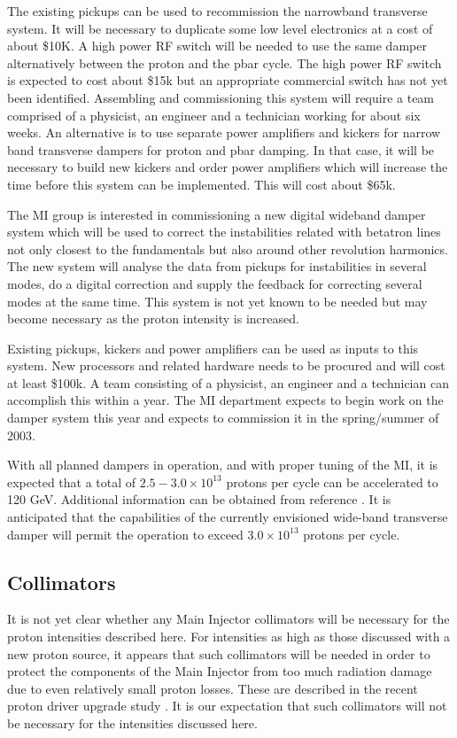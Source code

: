 \documentclass{article}
\begin{document}
The existing pickups can be used to recommission the narrowband transverse 
system. It will be necessary to duplicate some low level electronics at a 
cost of about
\$10K. A high power RF switch will be needed to use the same damper 
alternatively between the proton and the pbar cycle. The high power RF switch 
is expected to cost about \$15k but an appropriate commercial switch has not 
yet been identified. Assembling and commissioning this system
will require a team comprised of a physicist, an engineer and a technician
working for about six weeks. An alternative is to use separate power 
amplifiers and kickers for narrow band transverse dampers for proton and pbar 
damping. In that case, it will be necessary to build new kickers and 
order power amplifiers which will increase the time before this system can
be implemented. This will cost about \$65k.

The MI group is interested in commissioning a new digital wideband damper 
system which will be used to correct the instabilities related with betatron
lines not only closest to the fundamentals but also around other revolution
harmonics. The new system will analyse the data 
from pickups for instabilities in several modes, do a digital correction and 
supply the feedback for correcting several modes at the same time. This system
is not yet known to be needed but may become necessary as the proton intensity
is increased.

Existing pickups, kickers and power amplifiers can be used as inputs to
this system. New processors and related hardware needs to be procured and
will cost at least \$100k. A team consisting of a physicist,
an engineer and a technician can accomplish this within a year. The MI 
department expects to begin work on the damper system this year and 
expects to commission it in the spring/summer of 2003. 

With all planned dampers in operation, and with proper tuning of the MI,
it is expected that a total of $2.5-3.0\times10^{13}$ protons per cycle
can be accelerated to
120 GeV. Additional information can be obtained from reference 
\cite {Steimel}. It is anticipated that the capabilities of the 
currently envisioned wide-band
transverse damper will permit the operation to exceed $3.0 \times 10^{13}$
protons per cycle. 

\subsection {Collimators}
   It is not yet clear whether any Main Injector collimators will be necessary 
for the proton intensities described here. For intensities as high as those
discussed with a new proton source, it appears that such collimators will be
needed in order to protect the components of the Main Injector from too much
radiation damage due to even relatively small proton losses. These are 
described in the recent proton driver upgrade study \cite {PDstudy}. It
is our expectation that such collimators will not be necessary for the
intensities discussed here.
\end{document}
